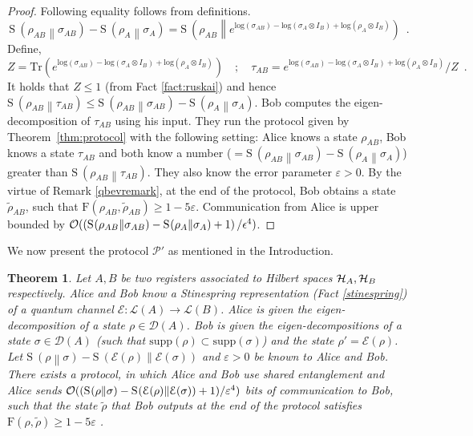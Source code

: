 \documentclass[11pt,a4paper]{article}
\def\F{\mathrn{F}}
\def\O{\CMcal{O}}
\def\H{\CMcal{H}}
\theoremstyle{plain}
\newtheorem{theorem}{Theorem}[section]
\theoremstyle{definition}
\newcommand {\br} [1] {\ensuremath{ \left( #1 \right) }}
\newcommand {\minusspace} {\: \! \!}
\newcommand {\fn} [2] {\ensuremath{ #1 \minusspace \br{ #2 } }}
\newcommand {\relent} [2] {\fn{\mathrm{S}}{#1 \middle\| #2}}
\newcommand {\Tr} {\ensuremath{ \mathrm{Tr} }}
\newcommand {\Prot}{\mathcal{P}}
\def\ve{{\varepsilon}}
\def\F{\mathrm{F}}
\def\E{\mathcal{E}}
\begin{document}
\begin{proof}
Following equality follows from definitions. 
\begin{equation*}
\relent{\rho_{AB}}{\sigma_{AB}}-\relent{\rho_A}{\sigma_A} = \relent{\rho_{AB}}{e^{\text{log}(\sigma_{AB})-\text{log}(\sigma_{A}\otimes I_B)+\text{log}(\rho_{A}\otimes I_B)}}  \enspace .
\end{equation*}
Define, 
$$Z= \Tr(e^{\text{log}(\sigma_{AB})-\text{log}(\sigma_{A}\otimes I_B)+\text{log}(\rho_{A}\otimes I_B)}) \quad ; \quad \tau_{AB}=e^{\text{log}(\sigma_{AB})-\text{log}(\sigma_{A}\otimes I_B)+\text{log}(\rho_{A}\otimes I_B)}/Z \enspace .$$ 
It holds that $Z\leq 1$ (from Fact \ref{fact:ruskai}) and hence $\relent{\rho_{AB}}{\tau_{AB}} \leq \relent{\rho_{AB}}{\sigma_{AB}}- \relent{\rho_A}{\sigma_A}$. 
Bob computes the eigen-decomposition of $\tau_{AB}$ using his input. They run the protocol given by Theorem~\ref{thm:protocol} with the following setting: Alice knows a state $\rho_{AB}$, Bob knows a state $\tau_{AB}$ and both know a number
($=\relent{\rho_{AB}}{\sigma_{AB}}- \relent{\rho_A}{\sigma_A}$) greater than $\relent{\rho_{AB}}{\tau_{AB}}$.
 They also know the error parameter $\ve>0$. By the virtue of Remark \ref{qbevremark}, at the end of the protocol, Bob obtains a state $\tilde{\rho}_{AB}$, such that $\F(\rho_{AB},\tilde{\rho}_{AB})\geq 1-5\ve$. Communication from Alice is upper bounded by $\O(\br{\relent{\rho_{AB}}{\sigma_{AB}}-\relent{\rho_A}{\sigma_A} +1}/\epsilon^4)$. 
\end{proof}

We now present the protocol $\Prot'$ as mentioned in the Introduction. 
\begin{theorem}
\label{thm:sideinfchannel}
Let $A,B$ be two registers associated to Hilbert spaces $\H_A,\H_B$ respectively. Alice and Bob know a Stinespring representation (Fact \ref{stinespring}) of a quantum channel $\E: \mathcal{L}(A)\rightarrow \mathcal{L}(B)$. Alice is given the eigen-decomposition of a state $\rho \in \mathcal{D}(A)$. Bob is given the eigen-decompositions of a state $\sigma \in \mathcal{D}(A)$ (such that $\text{supp}(\rho)\subset \text{supp}(\sigma)$) and the state $\rho'= \E(\rho)$. Let  $\relent{\rho}{\sigma}-\relent{\E(\rho)}{\E(\sigma)}$ and $\ve >0$ be known to Alice and Bob. There exists a protocol, in which Alice and Bob use shared entanglement and Alice sends $\O((\relent{\rho}{\sigma}-\relent{\E(\rho)}{\E(\sigma)}+1)/\ve^4)$ bits of communication to Bob, such that the state $\tilde{\rho}$ that Bob outputs at the end of the protocol satisfies  $\F(\rho,\tilde{\rho})\geq 1-5\ve$ .
\end{theorem}
\end{document}

